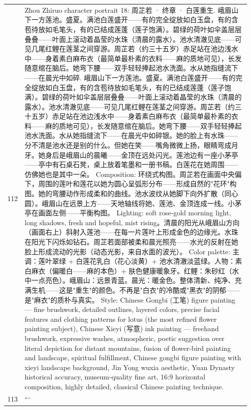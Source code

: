 \begin{longtable}{@{}>{\RaggedLeft\arraybackslash\footnotesize}p{0.04\linewidth}@{\hspace{0.8em}}>{\RaggedRight\arraybackslash\ttfamily\scriptsize}p{0.935\linewidth}@{}}
112 & Zhou Zhiruo character portrait 18: 周芷若 · 终章 · 白莲重生. 峨眉山下一方莲池。盛夏。满池白莲盛开——有的完全绽放如白玉盘，有的含苞待放如毛笔头，有的已结成莲蓬（莲子饱满）。碧绿的荷叶如伞盖层层叠叠——叶面上滚动着晶莹的水珠（清晨的露水）。池水清澈见底——可见几尾红鲤在莲茎之间穿游。周芷若（约三十五岁）赤足站在池边浅水中——身着素白麻布衣（最简单最朴素的衣料——麻的质地可见），长发随意绾在脑后。她弯下腰——双手轻轻捧起池水洗面。水从她指缝流下——在晨光中如碎. 峨眉山下一方莲池。盛夏。满池白莲盛开——有的完全绽放如白玉盘，有的含苞待放如毛笔头，有的已结成莲蓬（莲子饱满）。碧绿的荷叶如伞盖层层叠叠——叶面上滚动着晶莹的水珠（清晨的露水）。池水清澈见底——可见几尾红鲤在莲茎之间穿游。周芷若（约三十五岁）赤足站在池边浅水中——身着素白麻布衣（最简单最朴素的衣料——麻的质地可见），长发随意绾在脑后。她弯下腰——双手轻轻捧起池水洗面。水从她指缝流下——在晨光中如碎银。她的脸上有水珠——分不清是池水还是别的什么。但她在笑——嘴角微微上扬，眼睛弯成月牙。她身后是峨眉山的晨曦——金顶在远处闪光。莲池边有一座小茅亭——亭中有石桌石凳，桌上放着笔墨和一册书稿。白莲花在她周围——仿佛她也是其中一朵。 Composition: 环绕式构图。周芷若在画面中央偏下，周围的莲叶和莲花以她为圆心呈弧形分布——形成自然的"花环"构图。她的弯腰动作形成柔和的曲线。池水波纹从她脚下向外扩散（同心圆）。峨眉山在远景上方——天地轴线将她、莲池、金顶连成一线。小茅亭在画面左侧——平衡构图。 Lighting: soft rose-gold morning light, long shadows, fresh and hopeful, mist rising。清晨的阳光从峨眉山方向（画面右上）斜射入莲池——在每一片莲叶上形成金色的边缘光。水珠在阳光下闪烁如钻石。周芷若面部被柔和晨光照亮——水光的反射在她脸上形成流动的光影（动态光影，来自水面的波光）。 Color palette: 主调：莲叶翠绿 + 白莲花乳白（花心淡黄）+ 池水清澈淡蓝绿。人物：素白麻衣（偏暖白——麻的本色）+ 肤色健康暖象牙。红鲤：朱砂红（水中一点亮色）。峨眉山：远景青蓝。晨光：暖金色。整体清新、纯净、充满生机——这是"重生"的颜色。不再是"白衣"的冷酷或"黑衣"的阴郁——是"麻衣"的质朴与真实。 Style: Chinese Gongbi (工笔) figure painting — fine brushwork, detailed outlines, layered colors, precise facial features and clothing patterns for lotus (the most refined flower painting subject), Chinese Xieyi (写意) ink painting — freehand brushwork, expressive washes, atmospheric, poetic suggestion over literal depiction for distant mountains, fusion of flower-bird painting and landscape, spiritual fulfillment, Chinese gongbi figure painting with xieyi landscape background, Jin Yong wuxia aesthetic, Yuan Dynasty historical accuracy, museum-quality fine art, 16:9 horizontal composition, highly detailed, classical Chinese painting technique.\\
113 & ```\\

\end{longtable}
